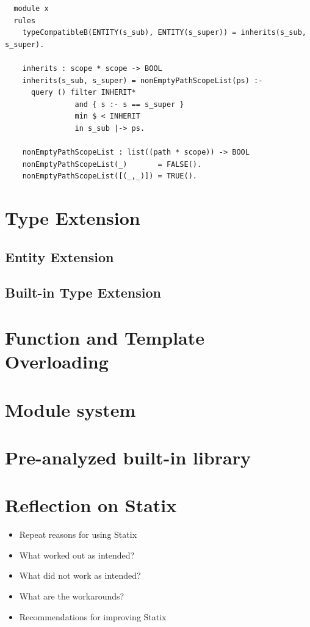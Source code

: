       \begin{verbatim}
  module x
  rules
    typeCompatibleB(ENTITY(s_sub), ENTITY(s_super)) = inherits(s_sub, s_super).

    inherits : scope * scope -> BOOL
    inherits(s_sub, s_super) = nonEmptyPathScopeList(ps) :-
      query () filter INHERIT*
                and { s :- s == s_super }
                min $ < INHERIT
                in s_sub |-> ps.

    nonEmptyPathScopeList : list((path * scope)) -> BOOL
    nonEmptyPathScopeList(_)       = FALSE().
    nonEmptyPathScopeList([(_,_)]) = TRUE().
      \end{verbatim}

  \section{\label{sec:type-extension}Type Extension}

    \subsection{\label{subsec:entity-extension}Entity Extension}

    \subsection{\label{subsec:built-in-extension}Built-in Type Extension}

  \section{\label{sec:function-template-overloading}Function and Template Overloading}

  \section{\label{sec:module-system}Module system}

  \section{\label{sec:built-in-library}Pre-analyzed built-in library}

  \section{\label{sec:statix-reflection}Reflection on Statix}

    \begin{itemize}
      \item Repeat reasons for using Statix
      \item What worked out as intended?
      \item What did not work as intended?
      \item What are the workarounds?
      \item Recommendations for improving Statix
    \end{itemize}
